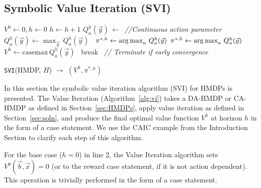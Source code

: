 \documentclass[twoside,11pt]{article}
\def\argmax{\operatornamewithlimits{arg\max}}
\newcommand{\casemax}{\mathrm{casemax}}
\begin{document}
\subsection{Symbolic Value Iteration (SVI)}
\label{section:SVI}
\incmargin{.5em}
\linesnumbered
\begin{algorithm}[t!]
\dontprintsemicolon
{}
\Begin
{
   $V^0 \leftarrow 0, h\leftarrow 0$\;
   {
       $h\leftarrow h+1$\;
       {
              $Q_a^{h}(\vec{y})\,\leftarrow \,$\;
			  \emph{//Continuous action parameter}\;
               {
               $Q_a^{h}(\vec{y}) \leftarrow \max_{\vec{y}} \, Q_a^{h}(\vec{y})$ $\,$ \;
               $\pi^{*,h} \leftarrow \argmax_{a} \, Q_a^{h}(\vec{y})$\;
               } 
               \Else 
               { $\pi^{*,h} \leftarrow \argmax_{a} \, Q_a^{h}(\vec{y})$ \; }
        }
       $V^{h} \leftarrow \casemax \, Q_a^{h}(\vec{y})$ $\,$ \;
           {break $\,$ \emph{// Terminate if early convergence}\;}
   }
      \;
}
\caption{\footnotesize \texttt{SVI}(HMDP, $H$) $\longrightarrow$ $(V^h,\pi^{*,h})$ \label{alg:vi}}
\end{algorithm}
\decmargin{.5em}
In this section the symbolic value iteration algorithm (SVI) for HMDPs is presented. The Value Iteration  (Algorithm~\ref{alg:vi}) takes a DA-HMDP or CA-HMDP as defined in Section~\ref{sec:HMDPs}, apply value
iteration as defined in Section~\ref{sec:soln}, and produce
the final optimal value function $V^h$ at horizon $h$ in the form
of a case statement. 
We use the \textsc{CAIC} example from the Introduction Section to clarify each step of this algorithm. 

For the base case ($h=0$) in line 2, the Value Iteration algorithm sets $V^0(\vec{b},\vec{x}) = 0$
(or to the reward case statement, if it is not action dependent). This operation
is trivially performed in the form of a case statement.
\end{document}
